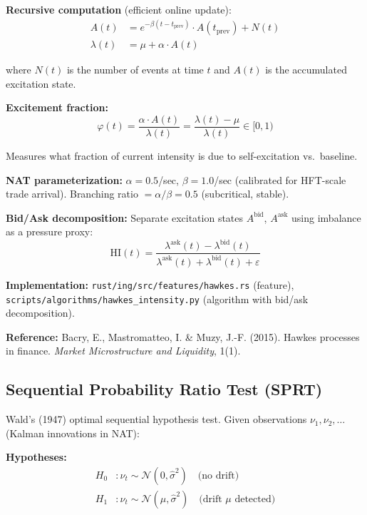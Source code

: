 \documentclass[11pt,a4paper]{article}
\begin{document}
\textbf{Recursive computation} (efficient online update):
\begin{align}
A(t) &= e^{-\beta(t - t_{\text{prev}})} \cdot A(t_{\text{prev}}) + N(t) \\
\lambda(t) &= \mu + \alpha \cdot A(t)
\end{align}

where $N(t)$ is the number of events at time $t$ and $A(t)$ is the accumulated excitation state.

\textbf{Excitement fraction:}
\begin{equation}
\varphi(t) = \frac{\alpha \cdot A(t)}{\lambda(t)} = \frac{\lambda(t) - \mu}{\lambda(t)} \in [0, 1)
\end{equation}

Measures what fraction of current intensity is due to self-excitation vs.\ baseline.

\textbf{NAT parameterization:} $\alpha = 0.5$/sec, $\beta = 1.0$/sec (calibrated for HFT-scale trade arrival). Branching ratio $= \alpha/\beta = 0.5$ (subcritical, stable).

\textbf{Bid/Ask decomposition:} Separate excitation states $A^{\text{bid}}$, $A^{\text{ask}}$ using imbalance as a pressure proxy:
\begin{equation}
\text{HI}(t) = \frac{\lambda^{\text{ask}}(t) - \lambda^{\text{bid}}(t)}{\lambda^{\text{ask}}(t) + \lambda^{\text{bid}}(t) + \varepsilon}
\end{equation}

\textbf{Implementation:} \texttt{rust/ing/src/features/hawkes.rs} (feature), \texttt{scripts/algorithms/hawkes\_intensity.py} (algorithm with bid/ask decomposition).

\textbf{Reference:} Bacry, E., Mastromatteo, I. \& Muzy, J.-F. (2015). Hawkes processes in finance. \textit{Market Microstructure and Liquidity}, 1(1).

\subsection{Sequential Probability Ratio Test (SPRT)}

Wald's (1947) optimal sequential hypothesis test. Given observations $\nu_1, \nu_2, \ldots$ (Kalman innovations in NAT):

\textbf{Hypotheses:}
\begin{align}
H_0 &: \nu_t \sim \mathcal{N}(0, \hat{\sigma}^2) \quad \text{(no drift)} \\
H_1 &: \nu_t \sim \mathcal{N}(\mu, \hat{\sigma}^2) \quad \text{(drift $\mu$ detected)}
\end{align}
\end{document}
